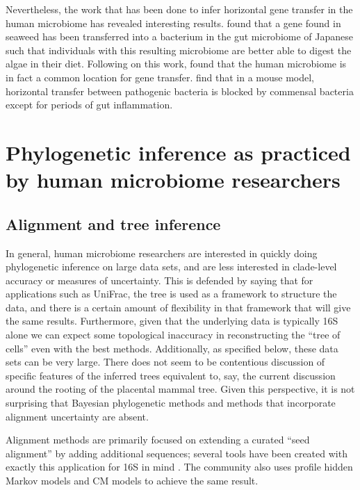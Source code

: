 \documentclass{amsart}
\begin{document}
Nevertheless, the work that has been done to infer horizontal gene transfer in the human microbiome has revealed interesting results.
\citet{hehemann2010transfer} found that a gene found in seaweed has been transferred into a bacterium in the gut microbiome of Japanese such that individuals with this resulting microbiome are better able to digest the algae in their diet.
Following on this work, \citet{smillie2011ecology} found that the human microbiome is in fact a common location for gene transfer.
\citet{stecher2012gut} find that in a mouse model, horizontal transfer between pathogenic bacteria is blocked by commensal bacteria except for periods of gut inflammation.


\section{Phylogenetic inference as practiced by human microbiome researchers}

\subsection{Alignment and tree inference}
In general, human microbiome researchers are interested in quickly doing phylogenetic inference on large data sets, and are less interested in clade-level accuracy or measures of uncertainty.
This is defended by saying that for applications such as UniFrac, the tree is used as a framework to structure the data, and there is a certain amount of flexibility in that framework that will give the same results.
Furthermore, given that the underlying data is typically 16S alone we can expect some topological inaccuracy in reconstructing the ``tree of cells'' even with the best methods.
Additionally, as specified below, these data sets can be very large.
There does not seem to be contentious discussion of specific features of the inferred trees equivalent to, say, the current discussion around the rooting of the placental mammal tree.
Given this perspective, it is not surprising that Bayesian phylogenetic methods and methods that incorporate alignment uncertainty are absent.

Alignment methods are primarily focused on extending a curated ``seed alignment'' by adding additional sequences; several tools have been created with exactly this application for 16S in mind \citep{desantis2006nast,caporaso2010pynast,pruesse2012sina}.
The community also uses profile hidden Markov models \citep{eddy1998profile} and CM models \citep{nawrocki2009infernal,nawrocki2009structural} to achieve the same result.
\end{document}
